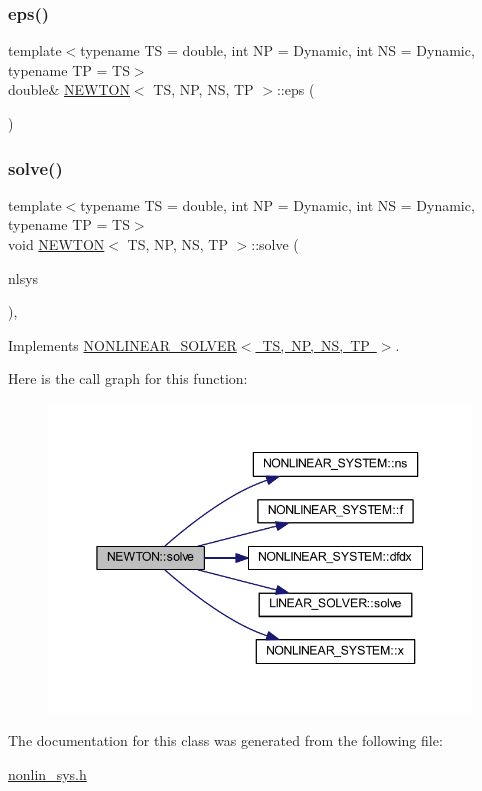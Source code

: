 \subsubsection{\texorpdfstring{eps()}{eps()}}
{\footnotesize\ttfamily template$<$typename TS  = double, int NP = Dynamic, int NS = Dynamic, typename TP  = TS$>$ \\
double\& \mbox{\hyperlink{class_n_e_w_t_o_n}{N\+E\+W\+T\+ON}}$<$ TS, NP, NS, TP $>$\+::eps (\begin{DoxyParamCaption}{ }\end{DoxyParamCaption})\hspace{0.3cm}{\ttfamily [inline]}}

\mbox{\label{class_n_e_w_t_o_n_a1dd31b882567d3e0427eb53ce169f0ce}} 
\subsubsection{\texorpdfstring{solve()}{solve()}}
{\footnotesize\ttfamily template$<$typename TS  = double, int NP = Dynamic, int NS = Dynamic, typename TP  = TS$>$ \\
void \mbox{\hyperlink{class_n_e_w_t_o_n}{N\+E\+W\+T\+ON}}$<$ TS, NP, NS, TP $>$\+::solve (\begin{DoxyParamCaption}\item[{\mbox{\hyperlink{class_n_o_n_l_i_n_e_a_r___s_y_s_t_e_m}{N\+O\+N\+L\+I\+N\+E\+A\+R\+\_\+\+S\+Y\+S\+T\+EM}}$<$ TS, NP, NS, TP $>$ \&}]{nlsys }\end{DoxyParamCaption})\hspace{0.3cm}{\ttfamily [inline]}, {\ttfamily [virtual]}}



Implements \mbox{\hyperlink{class_n_o_n_l_i_n_e_a_r___s_o_l_v_e_r_aae333fb75e2d5d8baa0e37991bfac7c4}{N\+O\+N\+L\+I\+N\+E\+A\+R\+\_\+\+S\+O\+L\+V\+E\+R$<$ T\+S, N\+P, N\+S, T\+P $>$}}.

Here is the call graph for this function\+:
\nopagebreak
\begin{figure}[H]
\begin{center}
\leavevmode
\includegraphics[width=345pt]{class_n_e_w_t_o_n_a1dd31b882567d3e0427eb53ce169f0ce_cgraph}
\end{center}
\end{figure}


The documentation for this class was generated from the following file\+:\begin{DoxyCompactItemize}
\item 
\mbox{\hyperlink{nonlin__sys_8h}{nonlin\+\_\+sys.\+h}}\end{DoxyCompactItemize}
